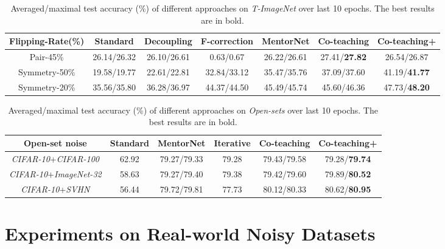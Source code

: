 \documentclass{article}
\begin{document}
\begin{table*}[!tp]\small
	\centering
	\caption{Averaged/maximal test accuracy (\%) of different approaches on \textit{T-ImageNet} over last 10 epochs. The best results are in bold.}
	\label{tab:imagenet_tiny}
	\scalebox{1}
	{
		\begin{tabular}{c | c | c | c | c | c | c }
			\hline
			Flipping-Rate(\%)     & Standard & Decoupling & F-correction & MentorNet & Co-teaching & Co-teaching+      \\ \hline
			Pair-45\%          & 26.14/26.32    & 26.10/26.61       & 0.63/0.67         & 26.22/26.61     & 27.41/\textbf{27.82}       & 26.54/26.87    \\ \hline
			Symmetry-50\%      & 19.58/19.77    & 22.61/22.81      & 32.84/33.12        & 35.47/35.76     & 37.09/37.60       & 41.19/\textbf{41.77}    \\ \hline
            Symmetry-20\%      & 35.56/35.80    & 36.28/36.97       & 44.37/44.50        & 45.49/45.74     & 45.60/46.36           & 47.73/\textbf{48.20}        \\ \hline
		\end{tabular}
	}
\end{table*}

\begin{table*}[!tp]\small
	\centering
	\caption{Averaged/maximal test accuracy (\%) of different approaches on \textit{Open-sets} over last 10 epochs. The best results are in bold.}
	\label{tab:openset}
	\scalebox{1}
	{
		\begin{tabular}{c | c | c | c | c | c }
			\hline
			Open-set noise                        & Standard  & MentorNet & Iterative \cite{wang2018iterative} & Co-teaching & Co-teaching+ \\ \hline
			\textit{CIFAR-10}+\textit{CIFAR-100}  & 62.92     & 79.27/79.33     & 79.28     & 79.43/79.58     & 79.28/\textbf{79.74}    \\ \hline
			\textit{CIFAR-10}+\textit{ImageNet-32} & 58.63     & 79.27/79.40     & 79.38     & 79.42/79.60     & 79.89/\textbf{80.52}    \\ \hline
            \textit{CIFAR-10}+\textit{SVHN}       & 56.44     & 79.72/79.81     & 77.73     & 80.12/80.33     & 80.62/\textbf{80.95}    \\ \hline
		\end{tabular}
	}
\end{table*}

\section{Experiments on Real-world Noisy Datasets}
\label{sect:experiments_openset}
\end{document}
